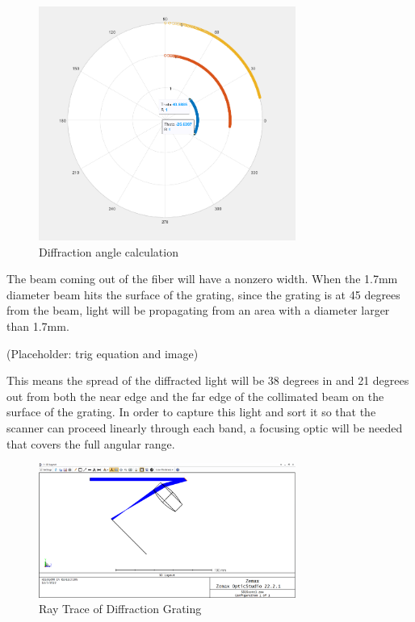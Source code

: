 \begin{figure}[H]
    \caption{Diffraction angle calculation}
    \centering
    \includegraphics[width=0.75\textwidth]{images/DiffractionAngleCalculator.png}
\end{figure}

The beam coming out of the fiber will have a nonzero width. When the 1.7mm diameter beam hits the surface of the grating, since the grating is at 45 degrees from the beam, light will be propagating from an area with a diameter larger than 1.7mm.

(Placeholder: trig equation and image)

This means the spread of the diffracted light will be 38 degrees in and 21 degrees out from both the near edge and the far edge of the collimated beam on the surface of the grating. In order to capture this light and sort it so that the scanner can proceed linearly through each band, a focusing optic will be needed that covers the full angular range.

\begin{figure}[H]
    \caption{Ray Trace of Diffraction Grating}
    \centering
    \includegraphics[width=0.75\textwidth]{images/Zemax Ray Trace.png}
\end{figure}

